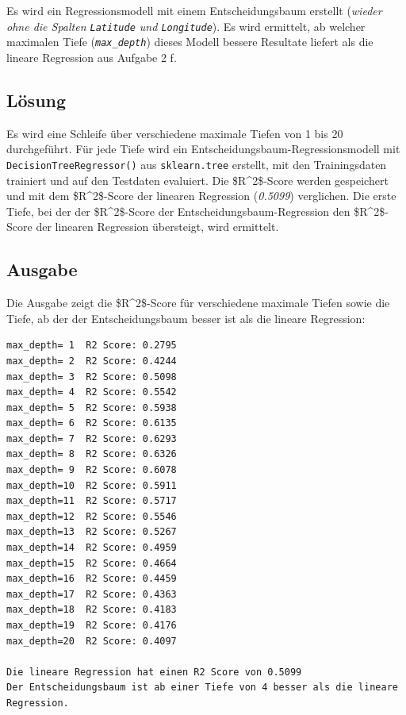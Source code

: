 Es wird ein Regressionsmodell mit einem Entscheidungsbaum erstellt (\textit{wieder ohne die Spalten \texttt{Latitude} und \texttt{Longitude}}). Es wird ermittelt, ab welcher maximalen Tiefe (\textit{\texttt{max\_depth}}) dieses Modell bessere Resultate liefert als die lineare Regression aus Aufgabe 2 f.

\subsection{Lösung}

Es wird eine Schleife über verschiedene maximale Tiefen von 1 bis 20 durchgeführt. Für jede Tiefe wird ein Entscheidungsbaum-Regressionsmodell mit \texttt{DecisionTreeRegressor()} aus \texttt{sklearn.tree} erstellt, mit den Trainingsdaten trainiert und auf den Testdaten evaluiert. Die \acs{$R^2$-Score} werden gespeichert und mit dem \acs{$R^2$-Score} der linearen Regression (\textit{0.5099}) verglichen. Die erste Tiefe, bei der der \acs{$R^2$-Score} der Entscheidungsbaum-Regression den \acs{$R^2$-Score} der linearen Regression übersteigt, wird ermittelt.



\subsection{Ausgabe}

Die Ausgabe zeigt die \acs{$R^2$-Score} für verschiedene maximale Tiefen sowie die Tiefe, ab der der Entscheidungsbaum besser ist als die lineare Regression:

\begin{verbatim}
max_depth= 1  R2 Score: 0.2795
max_depth= 2  R2 Score: 0.4244
max_depth= 3  R2 Score: 0.5098
max_depth= 4  R2 Score: 0.5542
max_depth= 5  R2 Score: 0.5938
max_depth= 6  R2 Score: 0.6135
max_depth= 7  R2 Score: 0.6293
max_depth= 8  R2 Score: 0.6326
max_depth= 9  R2 Score: 0.6078
max_depth=10  R2 Score: 0.5911
max_depth=11  R2 Score: 0.5717
max_depth=12  R2 Score: 0.5546
max_depth=13  R2 Score: 0.5267
max_depth=14  R2 Score: 0.4959
max_depth=15  R2 Score: 0.4664
max_depth=16  R2 Score: 0.4459
max_depth=17  R2 Score: 0.4363
max_depth=18  R2 Score: 0.4183
max_depth=19  R2 Score: 0.4176
max_depth=20  R2 Score: 0.4097

Die lineare Regression hat einen R2 Score von 0.5099
Der Entscheidungsbaum ist ab einer Tiefe von 4 besser als die lineare Regression.
\end{verbatim}


